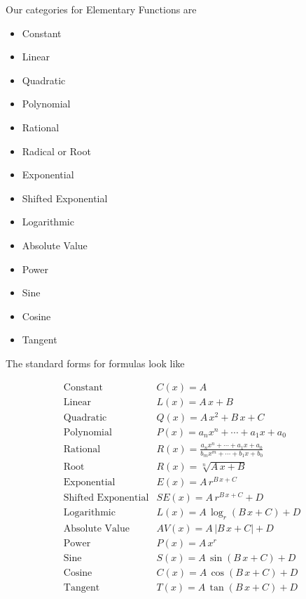 \documentclass{ximera}
\begin{document}
Our categories for Elementary Functions are

\begin{itemize}
    \item Constant
    \item Linear
    \item Quadratic
    \item Polynomial
    \item Rational
    \item Radical or Root
    \item Exponential
    \item Shifted Exponential 
    \item Logarithmic
    \item Absolute Value
    \item Power
    \item Sine
    \item Cosine
    \item Tangent
\end{itemize} 





The standard forms for formulas look like



\[
\begin{array}{ll}
\text{Constant}  & C(x) = A  \\
\text{Linear}  & L(x) = A \, x + B  \\
\text{Quadratic}  & Q(x) = A \, x^2 + B \, x + C  \\
\text{Polynomial}  & P(x) = a_n x^n + \cdots + a_1 x + a_0  \\
\text{Rational}  & R(x) = \frac{a_n x^n + \cdots + a_1 x + a_0}{b_m x^m + \cdots + b_1 x + b_0}  \\
\text{Root}  & R(x) = \sqrt[n]{A \, x + B}  \\
\text{Exponential}  & E(x) = A \, r^{B \, x + C}  \\
\text{Shifted Exponential}  & SE(x) = A \, r^{B \, x + C} + D  \\
\text{Logarithmic}  & L(x) = A \, \log_r(B \, x + C) + D  \\
\text{Absolute Value}  & AV(x) = A \, |B \, x + C| + D \\
\text{Power}  & P(x) = A \, x^r  \\
\text{Sine}  & S(x) = A \, \sin(B \, x + C) + D  \\
\text{Cosine}  & C(x) = A \, \cos(B \, x + C) + D  \\
\text{Tangent}  & T(x) = A \, \tan(B \, x + C) + D  
\end{array}
\]
\end{document}
